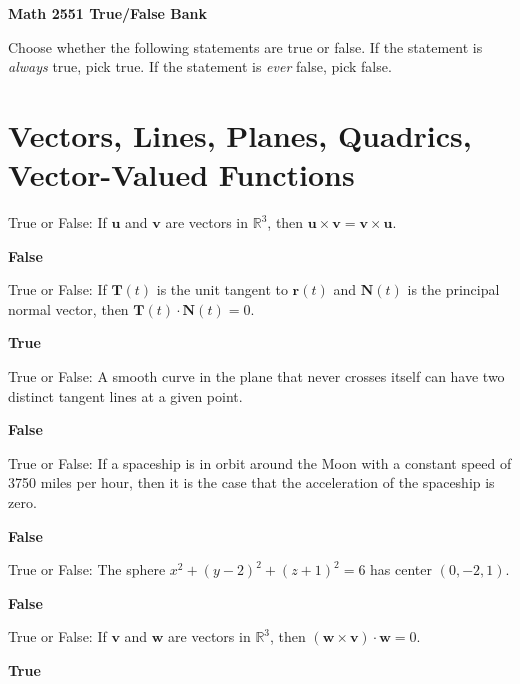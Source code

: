 \documentclass{exam}
\newcommand{\R}{\mathbb{R}}
\newcommand{\br}{\mathbf{r}}
\newcommand{\bu}{\mathbf{u}}
\newcommand{\bv}{\mathbf{v}}
\newcommand{\bw}{\mathbf{w}}
\newcommand{\bT}{\mathbf{T}}
\newcommand{\bN}{\mathbf{N}}
\begin{document}
	\begin{center}{\Large \textbf{Math 2551 True/False Bank}}
	\end{center}

	\unframedsolutions
	
	Choose whether the following statements are true or false. If the statement is \textit{always} true, pick true. If the statement is \textit{ever} false, pick false.
	
	\section{Vectors, Lines, Planes, Quadrics, Vector-Valued Functions}
	\begin{questions}
		\question True or False:  If $\bu$ and $\bv$ are vectors in $\R^3$, then $\bu\times \bv=\bv\times \bu$.
		 
		 \begin{solution}
		 	\textbf{False}
		 \end{solution}
		 
		\question True or False:  If $\bT(t)$ is the unit tangent to $\br(t)$ and $\bN(t)$ is the principal normal vector, then $\bT(t)\cdot\bN(t)=0$.
		 \begin{solution}
		 	\textbf{True}
		 \end{solution}

		\question True or False:  A smooth curve in the plane that never crosses itself can have two distinct tangent lines at a given point. 
		 \begin{solution}
		 	\textbf{False}
		 \end{solution}

		\question True or False:  If a spaceship is in orbit around the Moon with a constant speed of 3750 miles per hour, then it is the case that the acceleration of the spaceship is zero.  
		 \begin{solution}
		 	\textbf{False}
		 \end{solution}
		
		\question True or False:  The sphere $x^2+(y-2)^2+(z+1)^2=6$ has center $(0,-2,1)$.
		 \begin{solution}
		 	\textbf{False}
		 \end{solution}
		
		\question True or False: If $\bv$ and $\bw$ are vectors in $\mathbb{R}^3$, then $(\bw\times \bv)\cdot \bw=0$.
		 \begin{solution}
		 	\textbf{True}
		 \end{solution}
		

\end{questions}
\end{document}
